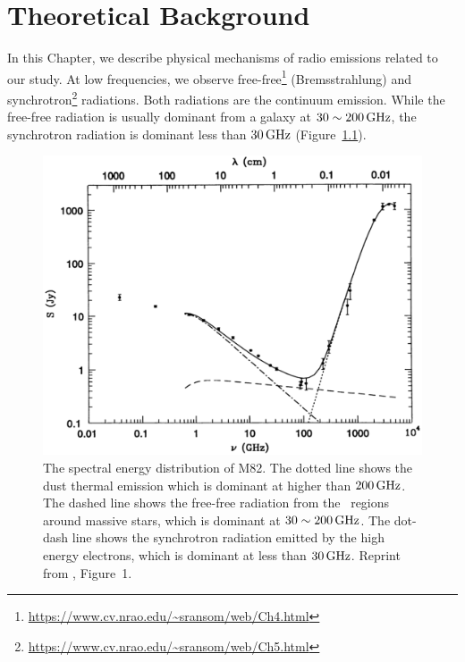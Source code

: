 \chapter{Theoretical Background}\label{chap:theory}
\begin{chapabstract}

    In this Chapter, we describe physical mechanisms of radio emissions related to our study.
    At low frequencies, we observe free-free\footnote{\url{https://www.cv.nrao.edu/~sransom/web/Ch4.html}} (Bremsstrahlung) and synchrotron\footnote{\url{https://www.cv.nrao.edu/~sransom/web/Ch5.html}} radiations.
    Both radiations are the continuum emission.
    While the free-free radiation is usually dominant from a galaxy at $30 \sim 200\,\mathrm{GHz}$, the synchrotron radiation is dominant less than $30\,\mathrm{GHz}$ (Figure~\ref{fig:Condon1992_figure1}).\\ \vspace{0.2cm}
\begin{figure}[htbp]
	\centering
	\includegraphics[width=.8\linewidth]{Chapter_2/Figures/Condon1992_Figure1.png}
    \caption[The spectral energy distribution of M82]{\label{fig:Condon1992_figure1}
        The spectral energy distribution of M82.
        The dotted line shows the dust thermal emission which is dominant at higher than $200\,\mathrm{GHz}$.
        The dashed line shows the free-free radiation from the \ih~regions around massive stars, which is dominant at $30 \sim 200\,\mathrm{GHz}$.
        The dot-dash line shows the synchrotron radiation emitted by the high energy electrons, which is dominant at less than $30\,\mathrm{GHz}$.
        Reprint from \citealt{Condon1992a}, Figure~1.
    }
\end{figure}

\end{chapabstract}



